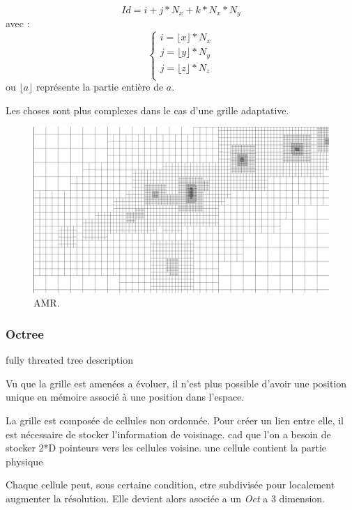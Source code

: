 \begin{equation}
Id = i + j*N_x + k * N_x*N_y
\end{equation}
avec :
\begin{equation}
\begin{cases}
i=\lfloor x \rfloor *N_x \\
j=\lfloor y \rfloor*N_y \\
j=\lfloor z \rfloor*N_z \\
\end{cases}
\end{equation}
ou $\lfloor a \rfloor$ représente la partie entière de $a$.

Les choses sont plus complexes dans le cas d'une grille adaptative.

\begin{figure}[bth]
        \includegraphics[width=.95\linewidth]{img/02/AMR.pdf} 
        \caption{AMR. 
}
 		\label{fig:AMR}
\end{figure}

\subsubsection{Octree}
fully threated tree description \citep{khokhlov_fully_1998-1}

Vu que la grille est amenées a évoluer, il n'est plus possible d'avoir une position unique en mémoire associé à une position dans l'espace.

La grille est composée de cellules non ordonnée.
Pour créer un lien entre elle, il est nécessaire de stocker l'information de voisinage.
cad que l'on a besoin de stocker 2*D pointeurs vers les cellules voisine.
 une cellule contient la partie physique 

Chaque cellule peut, sous certaine condition, etre subdivisée pour localement augmenter la résolution.
Elle devient alors asociée a un \emph{Oct} a 3 dimension.

